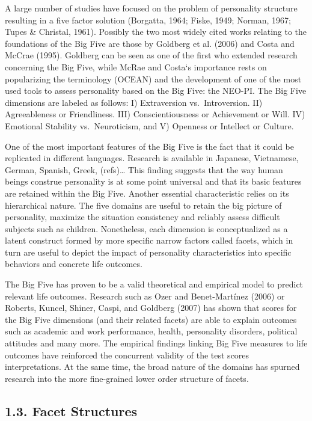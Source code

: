 \documentclass[,man]{apa6}
\theoremstyle{definition}
\theoremstyle{definition}
\theoremstyle{definition}
\theoremstyle{remark}
\begin{document}
A large number of studies have focused on the problem of personality
structure resulting in a five factor solution (Borgatta, 1964; Fiske,
1949; Norman, 1967; Tupes \& Christal, 1961). Possibly the two most
widely cited works relating to the foundations of the Big Five are those
by Goldberg et al. (2006) and Costa and McCrae (1995). Goldberg can be
seen as one of the first who extended research concerning the Big Five,
while McRae and Costa`s importance rests on popularizing the terminology
(OCEAN) and the development of one of the most used tools to assess
personality based on the Big Five: the NEO-PI. The Big Five dimensions
are labeled as follows: I) Extraversion vs.~Introversion. II)
Agreeableness or Friendliness. III) Conscientiousness or Achievement or
Will. IV) Emotional Stability vs.~Neuroticism, and V) Openness or
Intellect or Culture.

One of the most important features of the Big Five is the fact that it
could be replicated in different languages. Research is available in
Japanese, Vietnamese, German, Spanish, Greek, (refs)\ldots{} This
finding suggests that the way human beings construe personality is at
some point universal and that its basic features are retained within the
Big Five. Another essential characteristic relies on its hierarchical
nature. The five domains are useful to retain the big picture of
personality, maximize the situation consistency and reliably assess
difficult subjects such as children. Nonetheless, each dimension is
conceptualized as a latent construct formed by more specific narrow
factors called facets, which in turn are useful to depict the impact of
personality characteristics into specific behaviors and concrete life
outcomes.

The Big Five has proven to be a valid theoretical and empirical model to
predict relevant life outcomes. Research such as Ozer and Benet-Martínez
(2006) or Roberts, Kuncel, Shiner, Caspi, and Goldberg (2007) has shown
that scores for the Big Five dimensions (and their related facets) are
able to explain outcomes such as academic and work performance, health,
personality disorders, political attitudes and many more. The empirical
findings linking Big Five measures to life outcomes have reinforced the
concurrent validity of the test scores interpretations. At the same
time, the broad nature of the domains has spurned research into the more
fine-grained lower order structure of facets.

\hypertarget{facet-structures}{%
\subsection{1.3. Facet Structures}\label{facet-structures}}
\end{document}
